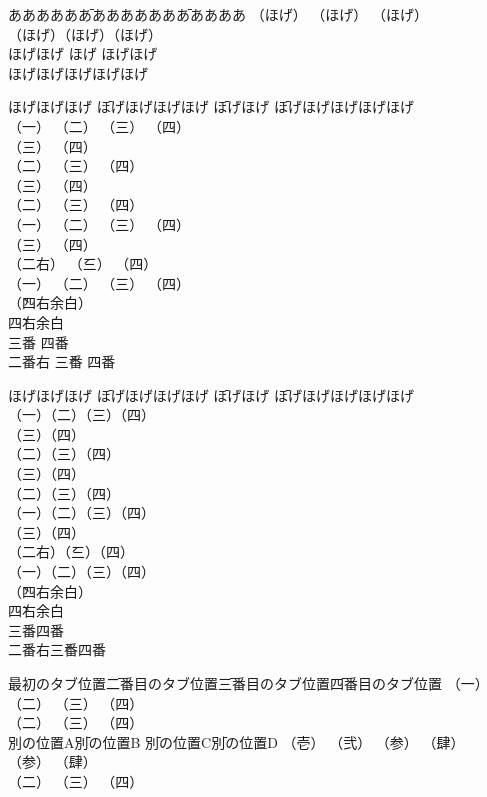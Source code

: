 \documentclass{article}
\begin{document}
\begin{tabbing}
あああああ\=あああああああ\=あああああ\kill
（ほげ） \> （ほげ） \> （ほげ） \\
（ほげ）\>（ほげ）\>（ほげ）\\
ほげほげ \> ほげ \> ほげほげ \\
ほげほげ\>ほげ\>ほげほげ
\end{tabbing}

\begin{tabbing}
ほげほげほげ \= ほげほげほげほげ \= ほげほげ \= ほげほげほげほげほげ \\
（一） \> （二） \> （三） \> （四） \+\+\\
                    （三） \> （四） \\
\< （二） \> （三） \> （四） \\
（三） \> （四） \-\\
（二） \> （三） \> （四） \-\\
（一） \> （二） \> （三） \> （四） \+\+\\
（三） \> （四） \\
（二右） \' （三） \> （四） \-\-\\
（一） \> （二） \> （三） \> （四） \\
\` （四右余白）\\ %
\` 四右余白 \+\+\\
三番 \> 四番 \\
二番右 \' 三番 \> 四番
\end{tabbing}

\begin{tabbing}
ほげほげほげ \= ほげほげほげほげ \= ほげほげ \= ほげほげほげほげほげ \\
（一）\>（二）\>（三）\>（四）\+\+\\
                （三）\>（四）\\
\<（二）\>（三）\>（四）\\
（三）\>（四）\-\\
（二）\>（三）\>（四）\-\\
（一）\>（二）\>（三）\>（四）\+\+\\
（三）\>（四）\\
（二右）\'（三）\>（四）\-\-\\
（一）\>（二）\>（三）\>（四）\\
\`（四右余白）\\ %
\`四右余白\+\+\\
三番\>四番\\
二番右\'三番\>四番
\end{tabbing}

\begin{tabbing}
最初のタブ位置\= 二番目のタブ位置\= 三番目のタブ位置\= 四番目のタブ位置\kill
（一）\> （二） \> （三） \> （四） \+\\
         （二） \> （三） \> （四） \\
\pushtabs
別の位置A\= 別の位置B \= 別の位置C\= 別の位置D\kill
（壱）\> （弐） \> （参） \> （肆） \+\+\\
                   （参） \> （肆） \-\-\\
\poptabs
         （二） \> （三） \> （四）
\end{tabbing}
\end{document}
